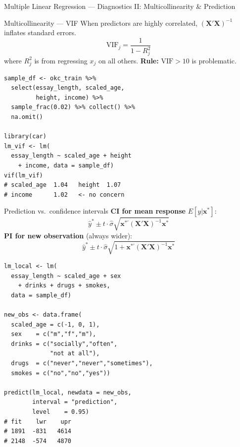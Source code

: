 \documentclass[11pt, aspectratio=169]{beamer}
\begin{document}
\begin{frame}{Multiple Linear Regression --- Diagnostics II: Multicollinearity \& Prediction}
	\begin{block}{Multicollinearity --- VIF}
				When predictors are highly correlated,
				$(\mathbf{X}'\mathbf{X})^{-1}$ inflates standard errors.
				\[
				\mathrm{VIF}_j = \frac{1}{1-R^2_j}
				\]
				where $R^2_j$ is from regressing $x_j$ on all others.
				\textbf{Rule:} $\mathrm{VIF} > 10$ is problematic.
			\end{block}
			\begin{lstlisting}[title={VIF via local lm (sampled data)}]
sample_df <- okc_train %>%
  select(essay_length, scaled_age,
         height, income) %>%
  sample_frac(0.02) %>% collect() %>%
  na.omit()

library(car)
lm_vif <- lm(
  essay_length ~ scaled_age + height
    + income, data = sample_df)
vif(lm_vif)
# scaled_age  1.04   height  1.07
# income      1.02   <- no concern
			\end{lstlisting}
		\begin{block}{Prediction vs.\ confidence intervals}
				\textbf{CI for mean response} $E[y|\mathbf{x}^*]$:
				\[
				\hat y^* \pm t\cdot\hat\sigma
				\sqrt{\mathbf{x}^{*\prime}(\mathbf{X}'\mathbf{X})^{-1}\mathbf{x}^*}
				\]
				\textbf{PI for new observation} (always wider):
				\[
				\hat y^* \pm t\cdot\hat\sigma
				\sqrt{1+\mathbf{x}^{*\prime}(\mathbf{X}'\mathbf{X})^{-1}\mathbf{x}^*}
				\]
			\end{block}
			\begin{lstlisting}[title={Prediction intervals via local lm}]
lm_local <- lm(
  essay_length ~ scaled_age + sex
    + drinks + drugs + smokes,
  data = sample_df)

new_obs <- data.frame(
  scaled_age = c(-1, 0, 1),
  sex    = c("m","f","m"),
  drinks = c("socially","often",
             "not at all"),
  drugs  = c("never","never","sometimes"),
  smokes = c("no","no","yes"))

predict(lm_local, newdata = new_obs,
        interval = "prediction",
        level    = 0.95)
# fit    lwr    upr
# 1891  -831   4614
# 2148  -574   4870
			\end{lstlisting}
		\end{frame}
\end{document}
